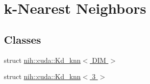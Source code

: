 \hypertarget{group__knn}{
\section{k-\/\-Nearest \-Neighbors}
\label{group__knn}
}
\subsection*{\-Classes}
\begin{DoxyCompactItemize}
\item 
struct \hyperlink{structnih_1_1cuda_1_1_kd__knn}{nih\-::cuda\-::\-Kd\-\_\-knn$<$ D\-I\-M $>$}
\item 
struct \hyperlink{structnih_1_1cuda_1_1_kd__knn_3_013_01_4}{nih\-::cuda\-::\-Kd\-\_\-knn$<$ 3 $>$}
\end{DoxyCompactItemize}
